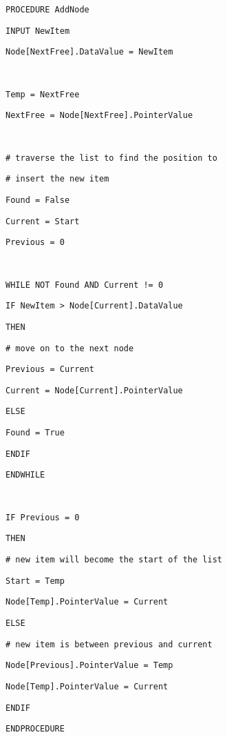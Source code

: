 \noindent %
\noindent\begin{minipage}[t]{1\columnwidth}%
\texttt{PROCEDURE AddNode}

\texttt{\qquad{}INPUT NewItem}

\texttt{\qquad{}Node{[}NextFree{]}.DataValue = NewItem}

\texttt{\bigskip{}
}

\texttt{\qquad{}Temp = NextFree }

\texttt{\qquad{}NextFree = Node{[}NextFree{]}.PointerValue }

\texttt{\bigskip{}
}

\texttt{\qquad{}\# traverse the list to find the position to }

\texttt{\qquad{}\# insert the new item }

\texttt{\qquad{}Found = False }

\texttt{\qquad{}Current = Start }

\texttt{\qquad{}Previous = 0}

\texttt{\bigskip{}
}

\texttt{\qquad{}WHILE NOT Found AND Current != 0 }

\texttt{\qquad{}\qquad{}IF NewItem > Node{[}Current{]}.DataValue}

\texttt{\qquad{}\qquad{}\qquad{}THEN}

\texttt{\qquad{}\qquad{}\qquad{}\qquad{}\# move on to the next
node }

\texttt{\qquad{}\qquad{}\qquad{}\qquad{}Previous = Current }

\texttt{\qquad{}\qquad{}\qquad{}\qquad{}Current = Node{[}Current{]}.PointerValue}

\texttt{\qquad{}\qquad{}\qquad{}ELSE }

\texttt{\qquad{}\qquad{}\qquad{}\qquad{}Found = True }

\texttt{\qquad{}\qquad{}ENDIF}

\texttt{\qquad{}ENDWHILE}

\texttt{\bigskip{}
}

\texttt{\qquad{}IF Previous = 0 }

\texttt{\qquad{}\qquad{}THEN }

\texttt{\qquad{}\qquad{}\qquad{}\# new item will become the start
of the list}

\texttt{\qquad{}\qquad{}\qquad{}Start = Temp }

\texttt{\qquad{}\qquad{}\qquad{}Node{[}Temp{]}.PointerValue = Current }

\texttt{\qquad{}\qquad{}ELSE}

\texttt{\qquad{}\qquad{}\qquad{}\# new item is between previous
and current }

\texttt{\qquad{}\qquad{}Node{[}Previous{]}.PointerValue = Temp}

\texttt{\qquad{}\qquad{}Node{[}Temp{]}.PointerValue = Current }

\texttt{\qquad{}ENDIF }

\texttt{ENDPROCEDURE}%
\end{minipage}

